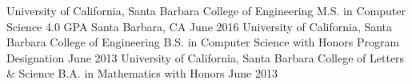 \begin{cventries}
  \cventry
    {University of California, Santa Barbara \newline College of Engineering}
    {M.S. in Computer Science\newline\vspace{-1mm} {\scriptsize \textmd{4.0 GPA}}}
    {Santa Barbara, CA}
    {June 2016%
}
    {
    }
\cventry
    {University of California, Santa Barbara \newline College of Engineering}
    {B.S. in Computer Science\newline\vspace{-1mm} {\scriptsize \textmd{with Honors Program Designation}}}
    {}
    {June 2013}{
}
\cventry
    {University of California, Santa Barbara \newline College of Letters \& Science}
    {B.A. in Mathematics \newline\vspace{-1mm} {\scriptsize \textmd{with Honors}}}
    {}
    {June 2013}
{
}
	
\end{cventries}